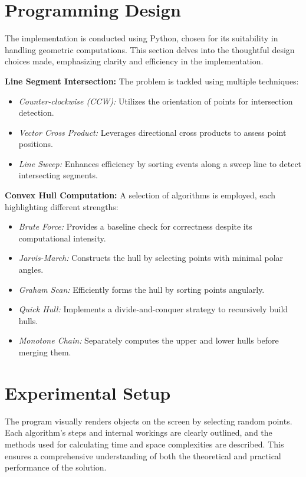 \documentclass[a4paper, 10pt, twocolumn]{article}
\begin{document}
\section{Programming Design}
The implementation is conducted using Python, chosen for its suitability in handling geometric computations. 
This section delves into the thoughtful design choices made, emphasizing clarity and efficiency in the implementation.

\textbf{Line Segment Intersection:} 
The problem is tackled using multiple techniques:
\begin{itemize}
  \item \textit{Counter-clockwise (CCW):} Utilizes the orientation of points for intersection detection.
  \item \textit{Vector Cross Product:} Leverages directional cross products to assess point positions.
  \item \textit{Line Sweep:} Enhances efficiency by sorting events along a sweep line to detect intersecting segments.
\end{itemize}

\textbf{Convex Hull Computation:}
A selection of algorithms is employed, each highlighting different strengths:
\begin{itemize}
  \item \textit{Brute Force:} Provides a baseline check for correctness despite its computational intensity.
  \item \textit{Jarvis-March:} Constructs the hull by selecting points with minimal polar angles.
  \item \textit{Graham Scan:} Efficiently forms the hull by sorting points angularly.
  \item \textit{Quick Hull:} Implements a divide-and-conquer strategy to recursively build hulls.
  \item \textit{Monotone Chain:} Separately computes the upper and lower hulls before merging them.
\end{itemize}

\section{Experimental Setup}
The program visually renders objects on the screen by selecting random points.
Each algorithm's steps and internal workings are clearly outlined, and the methods used for calculating time and space complexities are described.
This ensures a comprehensive understanding of both the theoretical and practical performance of the solution.
\end{document}
